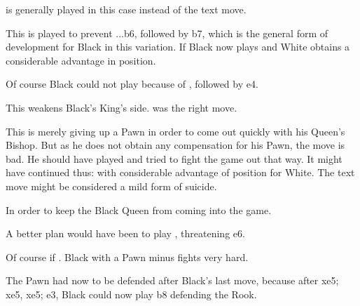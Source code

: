 \documentclass[10pt,twoside]{article}
\begin{document}

 is generally played in this case instead of the text move.


\board


This is played to prevent ...b6, followed by \figB b7, which is the general form of development for Black in this variation. If Black now plays  and White obtains a considerable advantage in position.


Of course Black could not play  because of , followed by \figQ e4.


This weakens Black's King's side.  was the right move.


\board


This is merely giving up a Pawn in order to come out quickly with his Queen's Bishop. But as he does not obtain any compensation for his Pawn, the move is bad. He should have played  and tried to fight the game out that way. It might have continued thus:  with considerable advantage of position for White. The text move might be considered a mild form of suicide.


In order to keep the Black Queen from coming into the game.


A better plan would have been to play , threatening e6.


Of course if . Black with a Pawn minus fights very hard.


The Pawn had now to be defended after Black's last move, because after \figB xe5; \figN xe5, \figQ xe5; \figR e3, Black could now play \figQ b8 defending the Rook.

\end{document}
